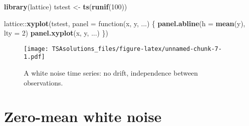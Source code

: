 \documentclass[]{book}
\newenvironment{Shaded}{\begin{snugshade}}{\end{snugshade}}
\newcommand{\KeywordTok}[1]{\textcolor[rgb]{0.13,0.29,0.53}{\textbf{{#1}}}}
\newcommand{\DataTypeTok}[1]{\textcolor[rgb]{0.13,0.29,0.53}{{#1}}}
\newcommand{\DecValTok}[1]{\textcolor[rgb]{0.00,0.00,0.81}{{#1}}}
\newcommand{\StringTok}[1]{\textcolor[rgb]{0.31,0.60,0.02}{{#1}}}
\newcommand{\NormalTok}[1]{{#1}}
\begin{document}
\begin{Shaded}
\begin{Highlighting}[]
\KeywordTok{library}\NormalTok{(lattice)}
\NormalTok{tstest <-}\StringTok{ }\KeywordTok{ts}\NormalTok{(}\KeywordTok{runif}\NormalTok{(}\DecValTok{100}\NormalTok{))}

\NormalTok{lattice::}\KeywordTok{xyplot}\NormalTok{(tstest,}
                \DataTypeTok{panel =} \NormalTok{function(x, y, ...) \{}
                  \KeywordTok{panel.abline}\NormalTok{(}\DataTypeTok{h =} \KeywordTok{mean}\NormalTok{(y), }\DataTypeTok{lty =} \DecValTok{2}\NormalTok{)}
                  \KeywordTok{panel.xyplot}\NormalTok{(x, y, ...)}
                \NormalTok{\})}
\end{Highlighting}
\end{Shaded}

\begin{figure}[htbp]
\centering
\texttt{[image: TSAsolutions\_files/figure-latex/unnamed-chunk-7-1.pdf]}
\caption{\label{fig:unnamed-chunk-7}A white noise time series: no drift,
independence between observations.}
\end{figure}

\section{Zero-mean white noise}\label{zero-mean-white-noise}
\end{document}
